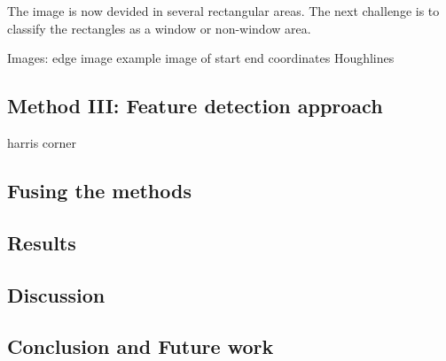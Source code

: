 The image is now devided in several rectangular areas. The next challenge is to 
classify the rectangles as a window or non-window area.



Images:
edge image
example image of start end coordinates Houghlines



\subsection{Method III: Feature detection approach}
	harris corner

\subsection{Fusing the methods}

\subsection{Results}
\subsection{Discussion}  %
\subsection{Conclusion and Future work}




% 
% 
% 
% 
% 
% 
% 
% 
